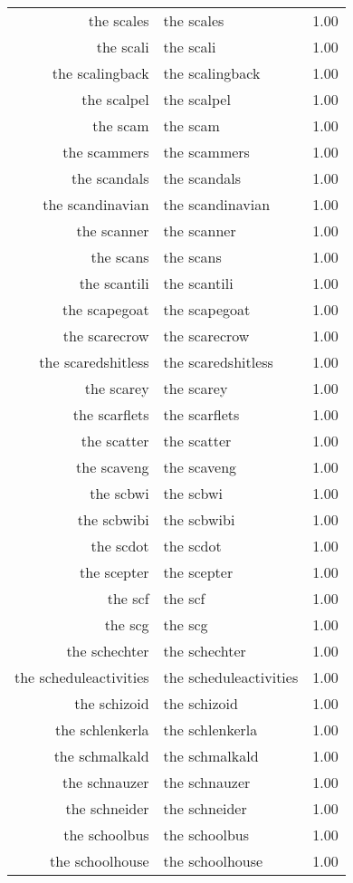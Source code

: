 \begin{table}[ht]
\begin{tabular}{rlr}
  the scales & the scales & 1.00 \\ 
  the scali & the scali & 1.00 \\ 
  the scalingback & the scalingback & 1.00 \\ 
  the scalpel & the scalpel & 1.00 \\ 
  the scam & the scam & 1.00 \\ 
  the scammers & the scammers & 1.00 \\ 
  the scandals & the scandals & 1.00 \\ 
  the scandinavian & the scandinavian & 1.00 \\ 
  the scanner & the scanner & 1.00 \\ 
  the scans & the scans & 1.00 \\ 
  the scantili & the scantili & 1.00 \\ 
  the scapegoat & the scapegoat & 1.00 \\ 
  the scarecrow & the scarecrow & 1.00 \\ 
  the scaredshitless & the scaredshitless & 1.00 \\ 
  the scarey & the scarey & 1.00 \\ 
  the scarflets & the scarflets & 1.00 \\ 
  the scatter & the scatter & 1.00 \\ 
  the scaveng & the scaveng & 1.00 \\ 
  the scbwi & the scbwi & 1.00 \\ 
  the scbwibi & the scbwibi & 1.00 \\ 
  the scdot & the scdot & 1.00 \\ 
  the scepter & the scepter & 1.00 \\ 
  the scf & the scf & 1.00 \\ 
  the scg & the scg & 1.00 \\ 
  the schechter & the schechter & 1.00 \\ 
  the scheduleactivities & the scheduleactivities & 1.00 \\ 
  the schizoid & the schizoid & 1.00 \\ 
  the schlenkerla & the schlenkerla & 1.00 \\ 
  the schmalkald & the schmalkald & 1.00 \\ 
  the schnauzer & the schnauzer & 1.00 \\ 
  the schneider & the schneider & 1.00 \\ 
  the schoolbus & the schoolbus & 1.00 \\ 
  the schoolhouse & the schoolhouse & 1.00 \\ 

\end{tabular}
\end{table}
